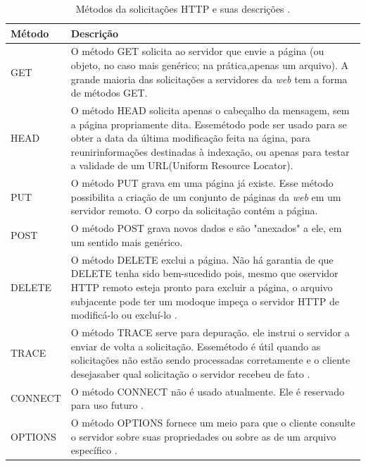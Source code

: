 \begin{table}[!ht]
\centering
\begin{tabular}{|l|l|}
\hline
{\color[HTML]{000000} \textbf{Método}} & {\color[HTML]{000000} \textbf{Descrição}} 
\\ \hline
GET                                    & \multicolumn{1}{p{13.50cm}|}{O método GET solicita ao servidor que envie a página (ou objeto, no caso mais genérico; na prática,apenas um arquivo). A grande maioria das solicitações a servidores da \textit{web} tem a forma de métodos GET.} 
\\ \hline
HEAD                                   & \multicolumn{1}{p{13.50cm}|}{O método HEAD solicita apenas o cabeçalho da mensagem, sem a página propriamente dita. Essemétodo pode ser usado para se obter a data da última modificação feita na ágina, para reunirinformações destinadas à indexação, ou apenas para testar a validade de um URL(Uniform Resource Locator).}
\\ \hline
PUT                                    & \multicolumn{1}{p{13.50cm}|}{O método PUT grava em uma página já existe. Esse método possibilita a criação de um conjunto de páginas da \textit{web} em um servidor remoto. O corpo da solicitação contém a página. } 
\\ \hline
POST                                   & \multicolumn{1}{p{13.50cm}|}{O método POST grava novos dados e são "anexados" a ele, em um sentido mais genérico\cite{Tanenbaum:2003}.} 
\\ \hline
DELETE                                 & \multicolumn{1}{p{13.50cm}|}{O método DELETE exclui a página. Não há garantia de que DELETE tenha sido bem-sucedido pois, mesmo que oservidor HTTP remoto esteja pronto para excluir a página, o arquivo subjacente pode ter um modoque impeça o servidor HTTP de modificá-lo ou excluí-lo \cite{Tanenbaum:2003}. }
\\ \hline
TRACE                                  & \multicolumn{1}{p{13.50cm}|}{O método TRACE serve para depuração. ele instrui o servidor a enviar de volta a solicitação. Essemétodo é útil quando as solicitações não estão sendo processadas corretamente e o cliente desejasaber qual solicitação o servidor recebeu de fato \cite{Tanenbaum:2003}.}   
\\ \hline
CONNECT                                & \multicolumn{1}{p{13.50cm}|}{O método CONNECT não é usado atualmente. Ele é reservado para uso futuro \cite{Tanenbaum:2003}.} \\ \hline
OPTIONS                                & \multicolumn{1}{p{13.50cm}|}{O método OPTIONS fornece um meio para que o cliente consulte o servidor sobre suas propriedades ou sobre as de um arquivo específico \cite{Tanenbaum:2003}.}
\\ \hline
\end{tabular}
\caption[Métodos da solicitações HTTP.]{Métodos da solicitações HTTP e suas descrições \cite{Tanenbaum:2003}.}
\label{Tab:MetodosHTTP}
\end{table}

